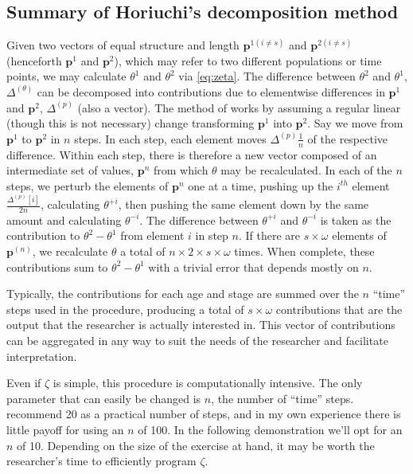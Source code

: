 \documentclass[12pt]{article}
\begin{document}
\subsection{Summary of Horiuchi's decomposition method}
Given two vectors of equal structure and length $\textbf{p}^{1(i \ne s)}$ and $\textbf{p}^{2(i \ne s)}$ (henceforth $\textbf{p}^1$ and $\textbf{p}^2$), which may refer to two different populations or time points, we may calculate $\theta^1$ and $\theta^2$ via \eqref{eq:zeta}. The difference between $\theta^2$ and $\theta^1$, $\Delta^{(\theta)}$ can be decomposed into contributions due to elementwise differences in $\textbf{p}^1$ and $\textbf{p}^2$, $\Delta^{(p)}$ (also a vector). The method of
\citet{horiuchi2008} works by assuming a regular linear (though this is not necessary) change transforming $\textbf{p}^{1}$ into $\textbf{p}^{2}$. Say we move from $\textbf{p}^1$ to $\textbf{p}^2$ in $n$ steps. In each step, each element moves $\Delta^{(p)} \frac{1}{n}$ of the respective difference. Within each step, there is therefore a new vector composed of an intermediate set of values, $\textbf{p}^n$ from which $\theta$
may be recalculated. In each of the $n$ steps, we perturb the elements of $\textbf{p}^n$ one at a time, pushing up the $i^{th}$ element $\frac{\Delta^{(p)}[i]}{2n}$, calculating $\theta^{+i}$, then pushing the same element down by the same amount and calculating $\theta^{-i}$. The difference between $\theta^{+i}$ and $\theta^{-i}$ is taken as the contribution to $\theta^2-\theta^1$ from element $i$ in step $n$. If there are $s\times\omega$ elements of $\textbf{p}^{(n)}$, we recalculate $\theta$ a total of $n\times2\times s\times\omega$ times. When complete, these contributions sum to $\theta^2-\theta^1$ with a trivial error that depends mostly on $n$.

Typically, the contributions for each age and stage are summed over the $n$ ``time'' steps used in the procedure, producing a total of $s \times \omega$ contributions that are the output that the researcher is actually interested in. This vector of contributions can be aggregated in any way to suit the needs of the researcher and facilitate interpretation. 

Even if $\zeta$ is simple, this procedure is computationally intensive. The only parameter that can easily be changed is $n$, the number of ``time'' steps. \citet{horiuchi2008} recommend 20 as a practical number of steps, and in my own experience there is little payoff for using an $n$ of 100. In the following demonstration we'll opt for an $n$ of 10. Depending on the size of the exercise at hand, it may be worth the researcher's time to efficiently program $\zeta$.
\end{document}
